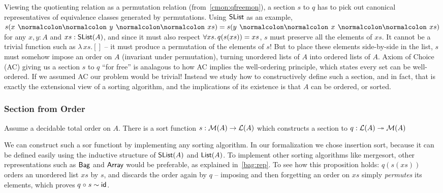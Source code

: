 Viewing the quotienting relation as a permutation relation (from~\cref{cmon:qfreemon}), a section $s$ to $q$ has to pick out
canonical representatives of equivalence classes generated by permutations.
%
Using $\operatorname{\mathsf{SList}}$ as an example, $s(x \cons y \cons xs) \id s(y \cons x \cons xs)$ for any $x, y : A$ and $xs : \operatorname{\mathsf{SList}}(A)$,
and since it must also respect $\forall xs.\,q(s(xs)) \id xs$, $s$ must preserve all the elements of $xs$.
It cannot be a trivial function such as $\lambda\,xs. []$ -- it must produce a permutation of the elements of $s$!
%
But to place these elements side-by-side in the list, $s$ must somehow impose an order on $A$
(invariant under permutation), turning unordered lists of $A$ into ordered lists of $A$.
%
Axiom of Choice (AC) giving us a section $s$ to $q$ ``for free'' is analagous to how
AC implies the well-ordering principle, which states every set can be well-ordered.
%
If we assumed AC our problem would be trivial!
%
Instead we study how to constructively define such a section, and in fact,
that is exactly the extensional view of a sorting algorithm,
and the implications of its existence is that $A$ can be ordered, or sorted.

\subsubsection{Section from Order}

\begin{proposition}
    Assume a decidable total order on $A$. There is a sort function $s: \mathcal{M}(A) \to \mathcal{L}(A)$
    which constructs a section to $q : \mathcal{L}(A) \twoheadrightarrow \mathcal{M}(A)$
\end{proposition}

\begin{proofsketch}
    We can construct such a sor functiont by implementing any sorting algorithm.
    In our formalization we chose insertion sort,
    because it can be defined easily using the inductive structure of $\operatorname{\mathsf{SList}}(A)$ and $\operatorname{\mathsf{List}}(A)$.
    To implement other sorting algorithms like mergesort,
    other representations such as $\operatorname{\mathsf{Bag}}$ and $\operatorname{\mathsf{Array}}$ would be preferable, as explained in~\cref{bag:rep}.
    To see how this proposition holds: $q(s(xs))$ orders an unordered list $xs$ by $s$,
    and discards the order again by $q$ --
    imposing and then forgetting an order on $xs$ simply \emph{permutes} its elements,
    which proves $q \mathrel{\circ} s \mathrel{\sim} \operatorname{\mathsf{id}}$.
\end{proofsketch}


